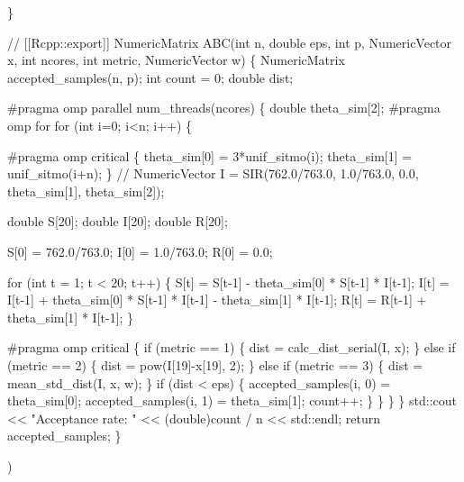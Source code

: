 \documentclass[
]{article}
\newenvironment{Shaded}{\begin{snugshade}}{\end{snugshade}}
\newcommand{\NormalTok}[1]{#1}
\newcommand{\StringTok}[1]{\textcolor[rgb]{0.31,0.60,0.02}{#1}}
\begin{document}
\begin{Shaded}
\begin{Highlighting}[]
\StringTok{\}}

\StringTok{// [[Rcpp::export]]}
\StringTok{NumericMatrix ABC(int n, double eps, int p, NumericVector x, int ncores, int metric, NumericVector w)}
\StringTok{\{}
\StringTok{  }
\StringTok{  NumericMatrix accepted\_samples(n, p);}
\StringTok{  int count = 0;}
\StringTok{  double dist;}

\StringTok{  \#pragma omp parallel num\_threads(ncores)}
\StringTok{  \{}
\StringTok{    double theta\_sim[2];}
\StringTok{    \#pragma omp for}
\StringTok{    for (int i=0; i\textless{}n; i++) \{}

\StringTok{      \#pragma omp critical}
\StringTok{      \{}
\StringTok{      theta\_sim[0] = 3*unif\_sitmo(i);}
\StringTok{      theta\_sim[1] = unif\_sitmo(i+n);}
\StringTok{      \}}
\StringTok{      }
\StringTok{      // NumericVector I = SIR(762.0/763.0, 1.0/763.0, 0.0, theta\_sim[1], theta\_sim[2]);}

\StringTok{      double S[20];}
\StringTok{      double I[20];}
\StringTok{      double R[20];}

\StringTok{      S[0] = 762.0/763.0;}
\StringTok{      I[0] = 1.0/763.0;}
\StringTok{      R[0] = 0.0;}

\StringTok{      for (int t = 1; t \textless{} 20; t++) \{}
\StringTok{        S[t] = S[t{-}1] {-} theta\_sim[0] * S[t{-}1] * I[t{-}1];}
\StringTok{        I[t] = I[t{-}1] + theta\_sim[0] * S[t{-}1] * I[t{-}1] {-} theta\_sim[1] * I[t{-}1];}
\StringTok{        R[t] = R[t{-}1] + theta\_sim[1] * I[t{-}1];}
\StringTok{      \}}

\StringTok{      \#pragma omp critical}
\StringTok{      \{}
\StringTok{      if (metric == 1) \{}
\StringTok{        dist = calc\_dist\_serial(I, x);}
\StringTok{      \} else if (metric == 2) \{}
\StringTok{        dist = pow(I[19]{-}x[19], 2);}
\StringTok{      \} else if (metric == 3) \{}
\StringTok{        dist = mean\_std\_dist(I, x, w);}
\StringTok{      \}}
\StringTok{      if (dist \textless{} eps) \{}
\StringTok{        accepted\_samples(i, 0) = theta\_sim[0];}
\StringTok{        accepted\_samples(i, 1) = theta\_sim[1];}
\StringTok{        count++;}
\StringTok{      \}}
\StringTok{      \}}
\StringTok{    \}}
\StringTok{  \}}
\StringTok{  }
\StringTok{  std::cout \textless{}\textless{} "Acceptance rate: " \textless{}\textless{} (double)count / n \textless{}\textless{} std::endl;}
\StringTok{  return accepted\_samples;}
\StringTok{  }
\StringTok{\}}

\StringTok{\textquotesingle{}}\NormalTok{)}
\end{Highlighting}
\end{Shaded}
\end{document}
